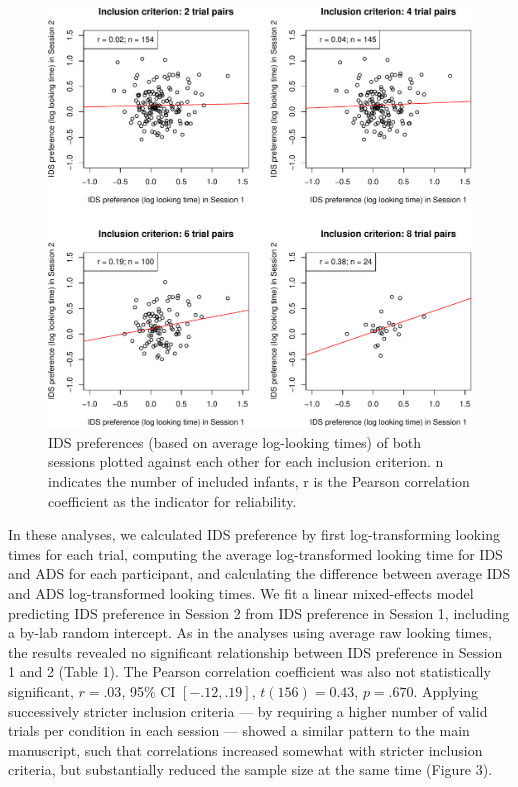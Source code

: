 \documentclass[
  man, donotrepeattitle,floatsintext]{apa6}
\begin{document}
\begin{figure}

{\centering \includegraphics[width=5in]{MB1T_supplement_files/figure-latex/unnamed-chunk-8-1} 

}

\caption{IDS preferences (based on average log-looking times) of both sessions plotted against each other for each inclusion criterion. n indicates the number of included infants, r is the Pearson correlation coefficient as the indicator for reliability.}\label{fig:unnamed-chunk-8}
\end{figure}

In these analyses, we calculated IDS preference by first log-transforming looking times for each trial, computing the average log-transformed looking time for IDS and ADS for each participant, and calculating the difference between average IDS and ADS log-transformed looking times.
We fit a linear mixed-effects model predicting IDS preference in Session 2 from IDS preference in Session 1, including a by-lab random intercept.
As in the analyses using average raw looking times, the results revealed no significant relationship between IDS preference in Session 1 and 2 (Table 1).
The Pearson correlation coefficient was also not statistically significant, \(r = .03\), 95\% CI \([-.12, .19]\), \(t(156) = 0.43\), \(p = .670\).
Applying successively stricter inclusion criteria --- by requiring a higher number of valid trials per condition in each session --- showed a similar pattern to the main manuscript, such that correlations increased somewhat with stricter inclusion criteria, but substantially reduced the sample size at the same time (Figure 3).
\end{document}
